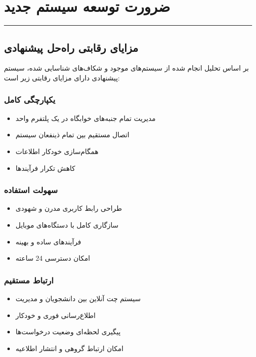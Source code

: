 \documentclass[12pt,a4paper]{report}
\begin{document}
	\section{ضرورت توسعه سیستم جدید}
	
	\noindent\rule{\textwidth}{0.4pt}
	
	\subsection{مزایای رقابتی راه‌حل پیشنهادی}
	
	بر اساس تحلیل انجام شده از سیستم‌های موجود و شکاف‌های شناسایی شده، سیستم پیشنهادی دارای مزایای رقابتی زیر است:
	
	\subsubsection{یکپارچگی کامل}
	\begin{itemize}
		\item مدیریت تمام جنبه‌های خوابگاه در یک پلتفرم واحد
		\item اتصال مستقیم بین تمام ذینفعان سیستم
		\item همگام‌سازی خودکار اطلاعات
		\item کاهش تکرار فرآیندها
	\end{itemize}
	
	\subsubsection{سهولت استفاده}
	\begin{itemize}
		\item طراحی رابط کاربری مدرن و شهودی
		\item سازگاری کامل با دستگاه‌های موبایل
		\item فرآیندهای ساده و بهینه
		\item امکان دسترسی 24 ساعته
	\end{itemize}
	
	\subsubsection{ارتباط مستقیم}
	\begin{itemize}
		\item سیستم چت آنلاین بین دانشجویان و مدیریت
		\item اطلاع‌رسانی فوری و خودکار
		\item پیگیری لحظه‌ای وضعیت درخواست‌ها
		\item امکان ارتباط گروهی و انتشار اطلاعیه
	\end{itemize}
	
\end{document}
